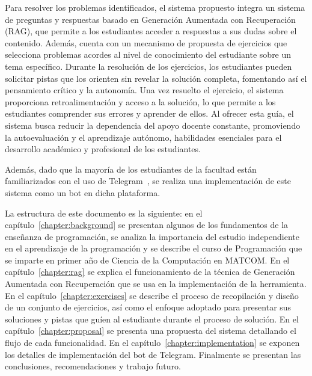 Para resolver los problemas identificados, el sistema propuesto integra un sistema de preguntas y respuestas basado en Generación Aumentada con Recuperación (RAG), que permite a los estudiantes acceder a respuestas a sus dudas sobre el contenido. Además, cuenta con un mecanismo de propuesta de ejercicios que selecciona problemas acordes al nivel de conocimiento del estudiante sobre un tema específico. Durante la resolución de los ejercicios, los estudiantes pueden solicitar pistas que los orienten sin revelar la solución completa, fomentando así el pensamiento crítico y la autonomía. Una vez resuelto el ejercicio, el sistema proporciona retroalimentación y acceso a la solución, lo que permite a los estudiantes comprender sus errores y aprender de ellos. Al ofrecer esta guía, el sistema busca reducir la dependencia del apoyo docente constante, promoviendo la autoevaluación y el aprendizaje autónomo, habilidades esenciales para el desarrollo académico y profesional de los estudiantes.

Además, dado que la mayoría de los estudiantes de la facultad están familiarizados con el uso de Telegram~\cite{Telegram}, se realiza una implementación de este sistema como un bot en dicha plataforma.

La estructura de este documento es la siguiente: en el capítulo~\ref{chapter:background} se presentan algunos de los fundamentos de la enseñanza de programación, se analiza la importancia del estudio independiente en el aprendizaje de la programación y se describe el curso de Programación que se imparte en primer año de Ciencia de la Computación en \mbox{MATCOM}. En el capítulo~\ref{chapter:rag} se explica el funcionamiento de la técnica de Generación Aumentada con Recuperación que se usa en la implementación de la herramienta. En el capítulo~\ref{chapter:exercises} se describe el proceso de recopilación y diseño de un conjunto de ejercicios, así como el enfoque adoptado para presentar sus soluciones y pistas que guíen al estudiante durante el proceso de solución. En el capítulo~\ref{chapter:proposal} se presenta una propuesta del sistema detallando el flujo de cada funcionalidad. En el capítulo~\ref{chapter:implementation} se exponen los detalles de implementación del bot de Telegram. Finalmente se presentan las conclusiones, recomendaciones y trabajo futuro.